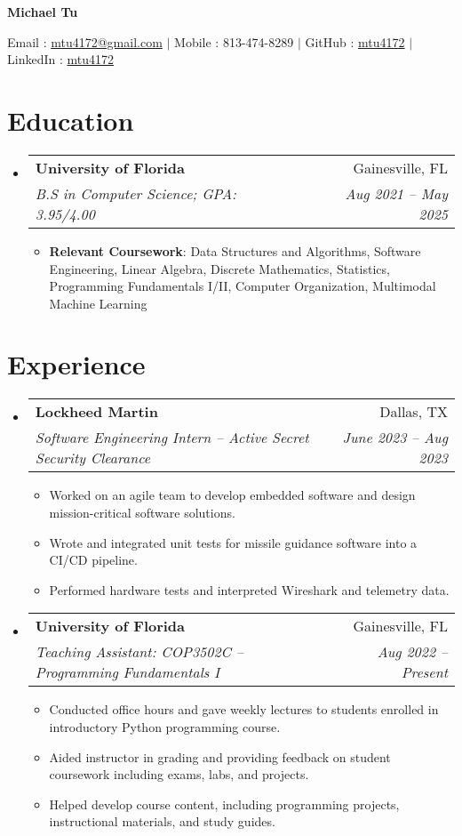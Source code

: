 \documentclass[letterpaper,11pt]{article}
\makeatletter
\newcommand{\resumeItem}[2]{
  \item\small{
    \textbf{#1}{: #2 \vspace{-2pt}}
  }
}
\newcommand{\resumeItemExperience}[1]{
  \item\small{
    {#1 \vspace{-2pt}}
  }
}
\newcommand{\resumeSubheading}[4]{
  \vspace{-1pt}\item
    \begin{tabular*}{0.97\textwidth}{l@{\extracolsep{\fill}}r}
      \textbf{#1} & #2 \\
      \textit{\small#3} & \textit{\small #4} \\
    \end{tabular*}\vspace{-6pt}
}
\newcommand{\resumeSubHeadingListStart}{\begin{itemize}[leftmargin=*, label={}]}
\newcommand{\resumeSubHeadingListEnd}{\end{itemize}}
\newcommand{\resumeItemListStart}{\begin{itemize}}
\newcommand{\resumeItemListEnd}{\end{itemize}\vspace{-5pt}}
\makeatother
\begin{document}
    \centerline{\textbf{\huge Michael Tu}}\vspace{0.15cm}
    \centerline{Email : \href{mailto:}{mtu4172@gmail.com} $|$
    Mobile : 813-474-8289 $|$
    GitHub : \href{http://github.com/mtu4172}{mtu4172} $|$
    LinkedIn : \href{http://linkedin.com/in/mtu4172}{mtu4172}}

\section{Education}
  \resumeSubHeadingListStart
    \resumeSubheading
      {University of Florida}{Gainesville, FL}
      {B.S in Computer Science; GPA: 3.95/4.00}{Aug 2021 -- May 2025}
    \resumeItemListStart
        \resumeItem{Relevant Coursework}
            {Data Structures and Algorithms, 
            Software Engineering, 
            Linear Algebra, 
            Discrete Mathematics, 
            Statistics, 
            Programming Fundamentals I/II, 
            Computer Organization,
            Multimodal Machine Learning
            }
    \resumeItemListEnd
  \resumeSubHeadingListEnd

\section{Experience}
  \resumeSubHeadingListStart
    \resumeSubheading
      {Lockheed Martin}{Dallas, TX}
      {Software Engineering Intern -- Active Secret Security Clearance}{June 2023 -- Aug 2023}
      \resumeItemListStart
        \resumeItemExperience
          {Worked on an agile team to develop embedded software and design mission-critical software solutions.}
        \resumeItemExperience
          {Wrote and integrated unit tests for missile guidance software into a CI/CD pipeline.}
        \resumeItemExperience
          {Performed hardware tests and interpreted Wireshark and telemetry data.}
        \resumeItemListEnd
    \resumeSubheading
      {University of Florida}{Gainesville, FL}
      {Teaching Assistant: COP3502C -- Programming Fundamentals I}{Aug 2022 -- Present}
      \resumeItemListStart
        \resumeItemExperience
          {Conducted office hours and gave weekly lectures to students enrolled in introductory Python programming course.}
        \resumeItemExperience
          {Aided instructor in grading and providing feedback on student coursework including exams, labs, and projects.}
        \resumeItemExperience
          {Helped develop course content, including programming projects, instructional materials, and study guides.}
        \resumeItemListEnd
  \resumeSubHeadingListEnd
\end{document}
